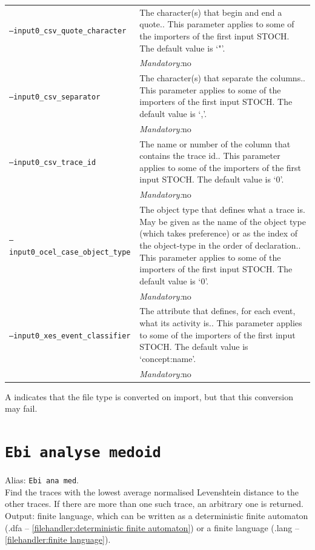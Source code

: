 {\begin{tabularx}{\linewidth}{lX}
\texttt{--input0\_csv\_quote\_character} & The character(s) that begin and end a quote.. This parameter applies to some of the importers of the first input STOCH. The default value is `"'.\\
&\textit{Mandatory:}\quad no\\
\texttt{--input0\_csv\_separator} & The character(s) that separate the columns.. This parameter applies to some of the importers of the first input STOCH. The default value is `,'.\\
&\textit{Mandatory:}\quad no\\
\texttt{--input0\_csv\_trace\_id} & The name or number of the column that contains the trace id.. This parameter applies to some of the importers of the first input STOCH. The default value is `0'.\\
&\textit{Mandatory:}\quad no\\
\texttt{--input0\_ocel\_case\_object\_type} & The object type that defines what a trace is. May be given as the name of the object type (which takes preference) or as the index of the object-type in the order of declaration.. This parameter applies to some of the importers of the first input STOCH. The default value is `0'.\\
&\textit{Mandatory:}\quad no\\
\texttt{--input0\_xes\_event\_classifier} & The attribute that defines, for each event, what its activity is.. This parameter applies to some of the importers of the first input STOCH. The default value is `concept:name'.\\
&\textit{Mandatory:}\quad no\\
\bottomrule
\end{tabularx}
A \textdagger{} indicates that the file type is converted on import, but that this conversion may fail.
\clearpage\section{\texttt{Ebi analyse medoid}}
\label{command:Ebi analyse medoid}
Alias: \texttt{Ebi ana med}.\\
Find the traces with the lowest average normalised Levenshtein distance to the other traces.
If there are more than one such trace, an arbitrary one is returned.\\
\noindent Output: finite language, which can be written as a deterministic finite automaton (.dfa -- \cref{filehandler:deterministic finite automaton}) or a finite language (.lang -- \cref{filehandler:finite language}).\\
}
